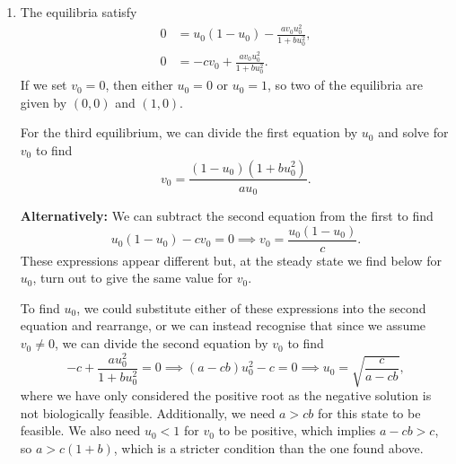 \documentclass[a4paper,12pt]{article}
\begin{document}
\begin{enumerate}
{\begin{enumerate}[label=(\alph*)]
        \end{enumerate}
    }{
        \begin{enumerate}[label=(\alph*)]

            \item
            The equilibria satisfy
            \begin{equation}
                \begin{aligned}
                    0
                    &=u_0(1-u_0)
                    -\frac{av_0u_0^2}{1+bu_0^2}, \\
                    0
                    &=-cv_0+\frac{av_0u_0^2}{1+bu_0^2}.
                \end{aligned}
            \end{equation}
            If we set $v_0=0$, then either $u_0=0$ or $u_0=1$, so two of
            the equilibria are given by $(0,0)$ and $(1,0)$.

            For the third equilibrium, we can divide the first equation by
            $u_0$ and solve for $v_0$ to find
            \[
                v_0=\frac{(1-u_0)(1+bu_0^2)}{au_0}.
            \]

            \textbf{Alternatively:} We can subtract the second equation
            from the first to find
            \[
                u_0(1-u_0)-cv_0=0
                \implies
                v_0=\frac{u_0(1-u_0)}{c}.
            \]
            These expressions appear different but, at the steady state
            we find below for $u_0$, turn out to give the same value for
            $v_0$.

            To find $u_0$, we could substitute either of these expressions
            into the second equation and rearrange, or we can instead
            recognise that since we assume $v_0\neq0$, we can divide the
            second equation by $v_0$ to find
            \[
                -c+\frac{au_0^2}{1+bu_0^2}=0
                \implies
                (a-cb)u_0^2-c=0
                \implies
                u_0=\sqrt{\frac{c}{a-cb}},
            \]
            where we have only considered the positive root as the
            negative solution is not biologically feasible. Additionally,
            we need $a>cb$ for this state to be feasible. We also need
            $u_0<1$ for $v_0$ to be positive, which implies
            $a-cb>c$, so $a>c(1+b)$, which is a stricter condition than
            the one found above.



\end{enumerate}}
\end{enumerate}
\end{document}
